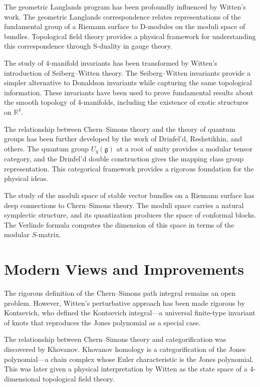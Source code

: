 The geometric Langlands program has been profoundly influenced by Witten's work. The geometric Langlands correspondence relates representations of the fundamental group of a Riemann surface to D-modules on the moduli space of bundles. Topological field theory provides a physical framework for understanding this correspondence through S-duality in gauge theory.

The study of 4-manifold invariants has been transformed by Witten's introduction of Seiberg--Witten theory. The Seiberg--Witten invariants provide a simpler alternative to Donaldson invariants while capturing the same topological information. These invariants have been used to prove fundamental results about the smooth topology of 4-manifolds, including the existence of exotic structures on $\mathbb{R}^4$.

The relationship between Chern--Simons theory and the theory of quantum groups has been further developed by the work of Drinfel'd, Reshetikhin, and others. The quantum group $U_q(\mathfrak{g})$ at a root of unity provides a modular tensor category, and the Drinfel'd double construction gives the mapping class group representation. This categorical framework provides a rigorous foundation for the physical ideas.

The study of the moduli space of stable vector bundles on a Riemann surface has deep connections to Chern--Simons theory. The moduli space carries a natural symplectic structure, and its quantization produces the space of conformal blocks. The Verlinde formula computes the dimension of this space in terms of the modular $S$-matrix.

\section{Modern Views and Improvements}

The rigorous definition of the Chern--Simons path integral remains an open problem. However, Witten's perturbative approach has been made rigorous by Kontsevich, who defined the Kontsevich integral---a universal finite-type invariant of knots that reproduces the Jones polynomial as a special case.

The relationship between Chern--Simons theory and categorification was discovered by Khovanov. Khovanov homology is a categorification of the Jones polynomial---a chain complex whose Euler characteristic is the Jones polynomial. This was later given a physical interpretation by Witten as the state space of a 4-dimensional topological field theory.

